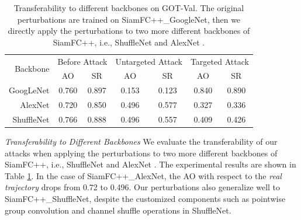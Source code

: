 \documentclass[journal]{IEEEtran}
\newcommand{\ie}{i.e.}
\begin{document}
\begin{table}[t]
  \centering
  \caption{Transferability to different backbones on GOT-Val. The original perturbations are trained on SiamFC++\_GoogleNet, then we directly apply the perturbations to two more different backbones of SiamFC++, \ie, ShuffleNet \cite{ShuffleNet} and AlexNet \cite{AlexNet}.}
  \begin{tabular}{rcccccc} 
  \toprule
  \multirow{2}{*}[-2pt]{Backbone} & \multicolumn{2}{c}{Before Attack} & \multicolumn{2}{c}{Untargeted Attack} & \multicolumn{2}{c}{Targeted Attack}  \\ 
  \cmidrule{2-7}
                            & AO    & SR                           & AO    & SR                           & AO    & SR                           \\ 
  \midrule
  GoogLeNet                 & 0.760 & 0.897                        & 0.153 & 0.123                        & 0.840 & 0.890                        \\
  AlexNet                   & 0.720 & 0.850                        & 0.496 & 0.577                        & 0.327 & 0.336                        \\
  ShuffleNet                & 0.766 & 0.888                        & 0.496 & 0.557                        & 0.409 & 0.426                       \\
  \bottomrule
  \end{tabular}
  \label{tab:backbone}
\end{table}
\textit{Transferability to Different Backbones} We evaluate the transferability of our attacks when applying the perturbations to two more different backbones of SiamFC++, \ie, ShuffleNet \cite{ShuffleNet} and AlexNet \cite{AlexNet}.
The experimental results are shown in Table \ref{tab:backbone}. In the case of SiamFC++\_AlexNet, the AO with respect to the \textit{real trajectory} drops from 0.72 to 0.496. 
Our perturbations also generalize well to SiamFC++\_ShuffleNet, despite the customized components such as pointwise group convolution and channel shuffle operations in ShuffleNet.
\end{document}
